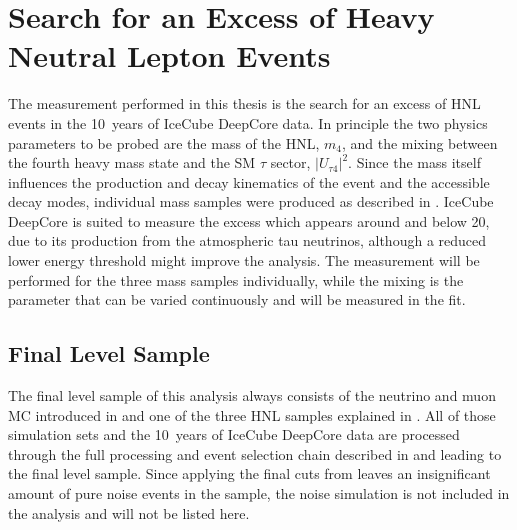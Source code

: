 \setchapterpreamble[u]{\margintoc}

\chapter{Search for an Excess of Heavy Neutral Lepton Events}

The measurement performed in this thesis is the search for an excess of HNL events in the \SI{10}{years} of IceCube DeepCore data. In principle the two physics parameters to be probed are the mass of the HNL, $m_4$, and the mixing between the fourth heavy mass state and the SM $\tau$ sector, $|U_{\tau4}|^2$. Since the mass itself influences the production and decay kinematics of the event and the accessible decay modes, individual mass samples were produced as described in .
IceCube DeepCore is suited to measure the excess which appears around and below \SI{20}{\gev}, due to its production from the atmospheric tau neutrinos, although a reduced lower energy threshold might improve the analysis. The measurement will be performed for the three mass samples individually, while the mixing is the parameter that can be varied continuously and will be measured in the fit. 


\section{Final Level Sample} 

The final level sample of this analysis always consists of the neutrino and muon MC introduced in  and one of the three HNL samples explained in . All of those simulation sets and the \SI{10}{years} of IceCube DeepCore data are processed through the full processing and event selection chain described in  and  leading to the final level sample. Since applying the final cuts from  leaves an insignificant amount of pure noise events in the sample, the noise simulation is not included in the analysis and will not be listed here.



